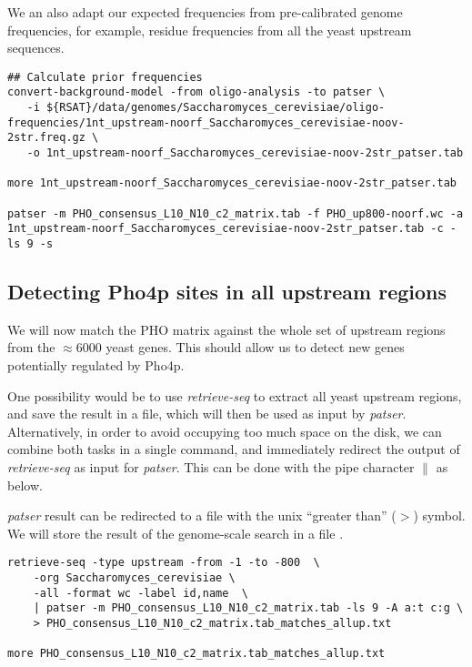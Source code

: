We an also adapt our expected frequencies from pre-calibrated genome
frequencies, for example, residue frequencies from all the yeast
upstream sequences.

{\color{Blue} \begin{footnotesize} 
\begin{verbatim}
## Calculate prior frequencies
convert-background-model -from oligo-analysis -to patser \
   -i ${RSAT}/data/genomes/Saccharomyces_cerevisiae/oligo-frequencies/1nt_upstream-noorf_Saccharomyces_cerevisiae-noov-2str.freq.gz \
   -o 1nt_upstream-noorf_Saccharomyces_cerevisiae-noov-2str_patser.tab

more 1nt_upstream-noorf_Saccharomyces_cerevisiae-noov-2str_patser.tab

patser -m PHO_consensus_L10_N10_c2_matrix.tab -f PHO_up800-noorf.wc -a 1nt_upstream-noorf_Saccharomyces_cerevisiae-noov-2str_patser.tab -c -ls 9 -s
\end{verbatim} \end{footnotesize}
}

\subsection{Detecting Pho4p sites in all upstream regions}

We will now match the PHO matrix against the whole set of upstream
regions from the $\approx 6000$ yeast genes. This should allow us to detect new
genes potentially regulated by Pho4p.

One possibility would be to use \textit{retrieve-seq} to extract all
yeast upstream regions, and save the result in a file, which will then
be used as input by \textit{patser}. Alternatively, in order to avoid
occupying too much space on the disk, we can combine both tasks in a
single command, and immediately redirect the output of
\textit{retrieve-seq} as input for \textit{patser}. This can be done
with the pipe character $\|$ as below.

\textit{patser} result can be redirected to a file with the unix
``greater than'' ($>$) symbol. We will store the result of the
genome-scale search in a file .

{\color{Blue} \begin{footnotesize} 
\begin{verbatim}
retrieve-seq -type upstream -from -1 -to -800  \
    -org Saccharomyces_cerevisiae \
    -all -format wc -label id,name  \
    | patser -m PHO_consensus_L10_N10_c2_matrix.tab -ls 9 -A a:t c:g \
    > PHO_consensus_L10_N10_c2_matrix.tab_matches_allup.txt

more PHO_consensus_L10_N10_c2_matrix.tab_matches_allup.txt
\end{verbatim} \end{footnotesize}
}

